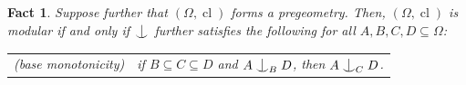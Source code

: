 \documentclass{article}
\newtheorem{fact}[theorem]{Fact}
\theoremstyle{remark}
\theoremstyle{definition}
\newcommand{\indep}[2]{%
  \mathrel{
    \mathop{
      \vcenter{
        \hbox{\oalign{\noalign{\kern-.3ex}\hfil$\vert$\rlap{$^\mathrm{#2}$}\hfil\cr
              \noalign{\kern-.7ex}
              $\smile$\cr\noalign{\kern-.3ex}}}
      }
    }\displaylimits_{#1}
  }
}
\DeclareMathOperator{\cl}{cl}
\def\Ind#1#2{#1\setbox0=\hbox{$#1x$}\kern\wd0\hbox to 0pt{\hss$#1\mid$\hss}
	\lower.9\ht0\hbox to 0pt{\hss$#1\smile$\hss}\kern\wd0}
\def\ind{\mathop{\mathpalette\Ind{}}}
\begin{document}
{{\begin{fact}
Suppose further that $(\Omega, \cl)$ forms a pregeometry. Then, $(\Omega, \cl)$ is modular if and only if $\ind$ further satisfies the following for all $A,B,C,D\subseteq \Omega$: 

\begin{tabular}{ll}
{\sc(base monotonicity)} & if {$B\subseteq C\subseteq D$ and   $A\indep{B}{} D$,  then $A\indep{C}{} D$.}
\end{tabular}


\end{fact}}}
\end{document}
